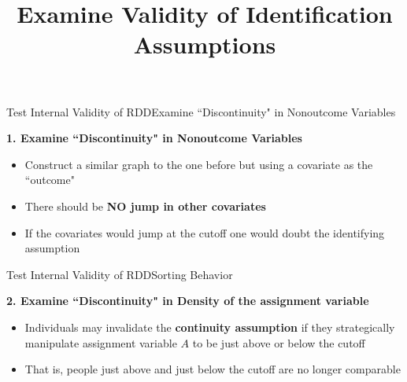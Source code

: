 \documentclass[dvipsnames,hyperref={pdfpagelabels=false}]{beamer}
\begin{document}
\title[]  
{Examine Validity of Identification Assumptions}


\author 
{}

\institute{}






\date
{}


\begin{frame}{}
	\titlepage
\end{frame}




\begin{frame}{Test Internal Validity of RDD}{Examine ``Discontinuity" in Nonoutcome Variables}
	
	\textbf{1. Examine ``Discontinuity" in Nonoutcome Variables}
	
	\begin{itemize}
		\vspace{0.2cm}	
		\item Construct a similar graph to the one before but using a covariate as the ``outcome"
		\vspace{0.2cm}	
		\item There should be \textbf{NO jump in other covariates}
		\vspace{0.2cm}	
		\item If the covariates would jump at the cutoff one would doubt the identifying assumption
		
	\end{itemize}
\end{frame}




\begin{frame}{Test Internal Validity of RDD}{Sorting Behavior}
	
	\textbf{2. Examine ``Discontinuity" in Density of the assignment variable}
	
	\begin{itemize}
		\vspace{0.2cm}	
		\item Individuals may invalidate the \textbf{continuity assumption} if they strategically manipulate assignment variable $A$ to be just above or below the cutoff
		\vspace{0.2cm}
		\item That is, people just above and just below the cutoff are no longer comparable
		\vspace{0.2cm}
		
		
	\end{itemize}
\end{frame}
\end{document}
